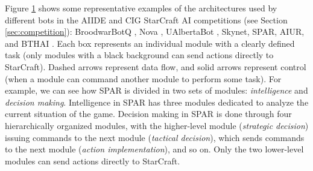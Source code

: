\documentclass{llncs}
\begin{document}
\begin{figure}[h!]
    \label{fig:bot-architecture}
\end{figure}

Figure \ref{fig:bot-architecture} shows some representative examples of the architectures used by different bots in the AIIDE and CIG StarCraft AI competitions (see Section \ref{sec:competition}): BroodwarBotQ \cite{SynnaeveMicroCig11}, Nova \cite{uriarte2012kiting}, UAlbertaBot \cite{churchill2011build}, Skynet, SPAR, AIUR, and BTHAI \cite{Hagelback12}. Each box represents an individual module with a clearly defined task (only modules with a black background can send actions directly to StarCraft). Dashed arrows represent data flow, and solid arrows represent control (when a module can command another module to perform some task). For example, we can see how SPAR is divided in two sets of modules: {\em intelligence} and {\em decision making}. Intelligence in SPAR has three modules dedicated to analyze the current situation of the game. Decision making in SPAR is done through four hierarchically organized modules, with the higher-level module ({\em strategic decision}) issuing commands to the next module ({\em tactical decision}), which sends commands to the next module ({\em action implementation}), and so on. Only the two lower-level modules can send actions directly to StarCraft. 
\end{document}
